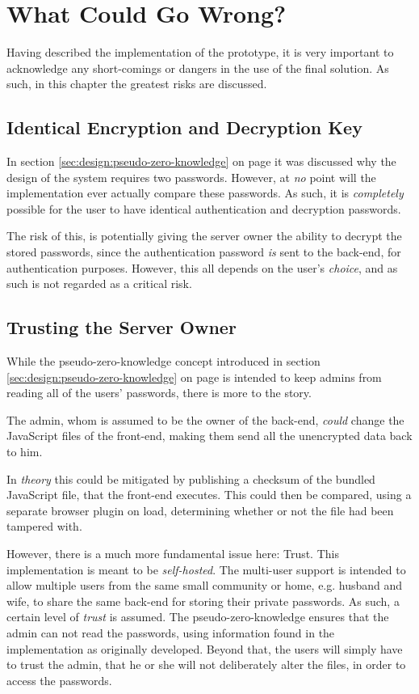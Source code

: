 \chapter{What Could Go Wrong?}
	Having described the implementation of the prototype, it is very important to acknowledge any short-comings or dangers in the use of the final solution. As such, in this chapter the greatest risks are discussed.

	\section{Identical Encryption and Decryption Key}
		In section \ref{sec:design:pseudo-zero-knowledge} on page \pageref{sec:design:pseudo-zero-knowledge} it was discussed why the design of the system requires two passwords. However, at \emph{no} point will the implementation ever actually compare these passwords. As such, it is \emph{completely} possible for the user to have identical authentication and decryption passwords.

		The risk of this, is potentially giving the server owner the ability to decrypt the stored passwords, since the authentication password \emph{is} sent to the back-end, for authentication purposes. However, this all depends on the user's \emph{choice}, and as such is not regarded as a critical risk.
	
	\section{Trusting the Server Owner}
		While the pseudo-zero-knowledge concept introduced in section \ref{sec:design:pseudo-zero-knowledge} on page \pageref{sec:design:pseudo-zero-knowledge} is intended to keep admins from reading all of the users' passwords, there is more to the story.

		The admin, whom is assumed to be the owner of the back-end, \emph{could} change the JavaScript files of the front-end, making them send all the unencrypted data back to him. 

		In \emph{theory} this could be mitigated by publishing a checksum of the bundled JavaScript file, that the front-end executes. This could then be compared, using a separate browser plugin on load, determining whether or not the file had been tampered with.

		However, there is a much more fundamental issue here: Trust. This implementation is meant to be \emph{self-hosted}. The multi-user support is intended to allow multiple users from the same small community or home, e.g. husband and wife, to share the same back-end for storing their private passwords. As such, a certain level of \emph{trust} is assumed. The pseudo-zero-knowledge ensures that the admin can not read the passwords, using information found in the implementation as originally developed. Beyond that, the users will simply have to trust the admin, that he or she will not deliberately alter the files, in order to access the passwords.


